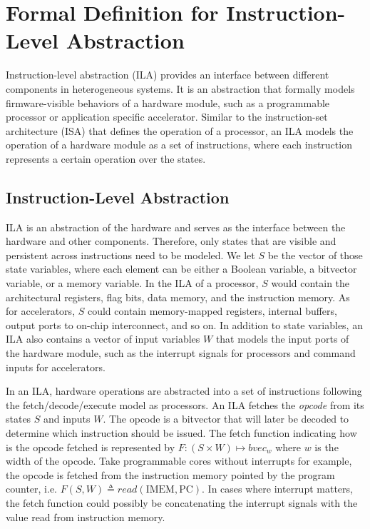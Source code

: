 \providecommand{\bd}[0]{\mathbb{B}}
\providecommand{\st}[1]{\mathrm{#1}}
\providecommand{\ft}[1]{\mathtt{#1}}

\section*{Formal Definition for Instruction-Level Abstraction}

Instruction-level abstraction (ILA) provides an interface between different 
components in heterogeneous systems.
It is an abstraction that formally models firmware-visible behaviors of a hardware
module, such as a programmable processor or application specific accelerator.
Similar to the instruction-set architecture (ISA) that defines the operation of
a processor, an ILA models the operation of a hardware module as a set of 
instructions, where each instruction represents a certain operation over the 
states.

\subsection*{Instruction-Level Abstraction}
ILA is an abstraction of the hardware and serves as the interface between 
the hardware and other components.
Therefore, only states that are visible and persistent across instructions need
to be modeled.
We let $S$ be the vector of those state variables, where each element can be 
either a Boolean variable, a bitvector variable, or a memory variable.
In the ILA of a processor, $S$ would contain the architectural registers, flag
bits, data memory, and the instruction memory.
As for accelerators, $S$ could contain memory-mapped registers, internal buffers, 
output ports to on-chip interconnect, and so on.
In addition to state variables, an ILA also contains a vector of input variables
$W$ that models the input ports of the hardware module, such as the interrupt 
signals for processors and command inputs for accelerators.

In an ILA, hardware operations are abstracted into a set of instructions 
following the fetch/decode/execute model as processors.
%
An ILA fetches the \textit{opcode} from its states $S$ and inputs $W$.
The opcode is a bitvector that will later be decoded to determine which 
instruction should be issued.
The fetch function indicating how is the opcode fetched is represented by 
$F : (S \times W) \mapsto bvec_w$ where $w$ is the width of the opcode.
Take programmable cores without interrupts for example, the opcode is fetched 
from the instruction memory pointed by the program counter, i.e. 
$F(S, W) \triangleq read( \st{IMEM}, \st{PC} )$.
In cases where interrupt matters, the fetch function could possibly be 
concatenating the interrupt signals with the value read from instruction memory.

